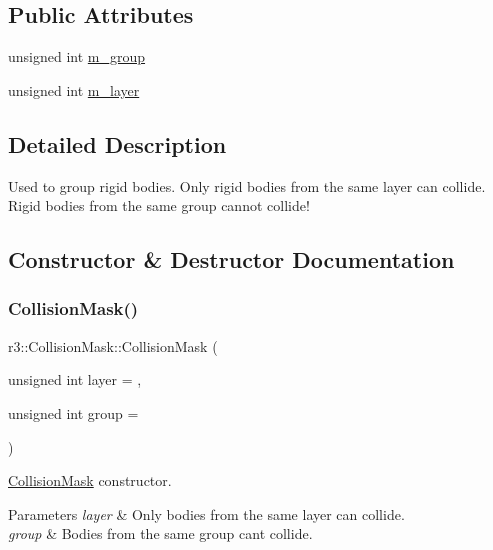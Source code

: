 \subsection*{Public Attributes}
\begin{DoxyCompactItemize}
\item 
unsigned int \mbox{\hyperlink{structr3_1_1_collision_mask_a07999f53c748c86623b00e4e07d24d5f}{m\+\_\+group}}
\item 
unsigned int \mbox{\hyperlink{structr3_1_1_collision_mask_a4e3ed2227bb1782f7c6dc948a8427620}{m\+\_\+layer}}
\end{DoxyCompactItemize}


\subsection{Detailed Description}
Used to group rigid bodies. Only rigid bodies from the same layer can collide. Rigid bodies from the same group cannot collide! 

\subsection{Constructor \& Destructor Documentation}
\mbox{\label{structr3_1_1_collision_mask_a7f1fb1fae3d7e14677ad2590fcd661e0}} 
\subsubsection{\texorpdfstring{Collision\+Mask()}{CollisionMask()}}
{\footnotesize\ttfamily r3\+::\+Collision\+Mask\+::\+Collision\+Mask (\begin{DoxyParamCaption}\item[{unsigned int}]{layer = {},  }\item[{unsigned int}]{group = {} }\end{DoxyParamCaption})\hspace{0.3cm}{\ttfamily [explicit]}}



\mbox{\hyperlink{structr3_1_1_collision_mask}{Collision\+Mask}} constructor. 


\begin{DoxyParams}{Parameters}
{\em layer} & Only bodies from the same layer can collide. \\
\hline
{\em group} & Bodies from the same group can\textquotesingle{}t collide. \\
\hline
\end{DoxyParams}


